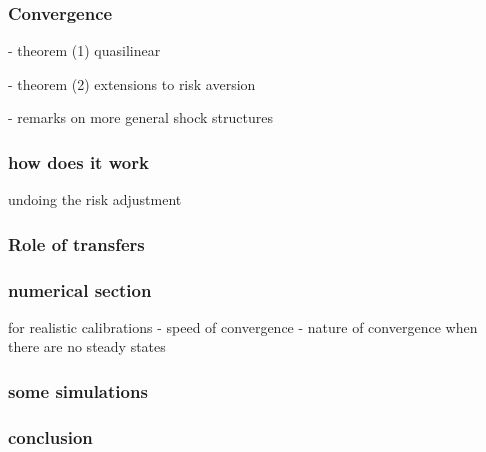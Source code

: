 \documentclass{beamer}
\begin{document}
 \begin{frame}
  \frametitle{Convergence}
  - theorem (1) quasilinear
 
 - theorem (2) extensions to risk aversion
 
 - remarks on more general shock structures
 \end{frame}

 
 \begin{frame}
  \frametitle{how does it work}
  undoing the risk adjustment
 \end{frame}

 
 
 \begin{frame}
  \frametitle{Role of transfers}
 \end{frame}

 
  
 \begin{frame}
  \frametitle{numerical section}
   for realistic calibrations
  - speed of convergence
  - nature of convergence when there are no steady states
 \end{frame}
 
 
 \begin{frame}
  \frametitle{some simulations}
  \end{frame}
 
 \begin{frame}
  \frametitle{conclusion}
 \end{frame}

 
\end{document}
